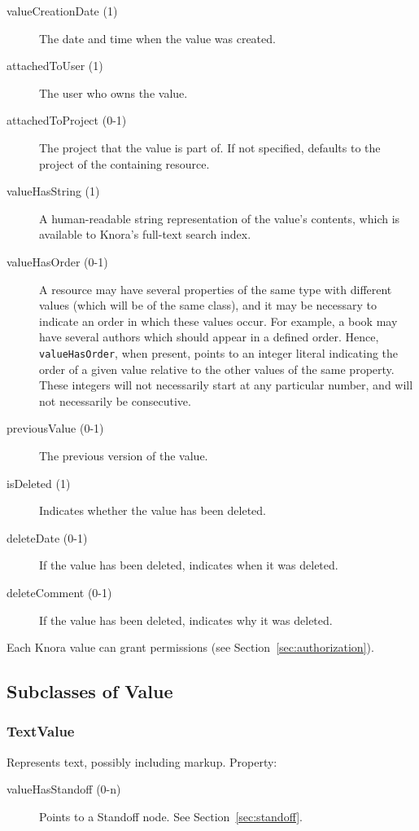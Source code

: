 \documentclass[12pt, a4paper]{article}
\begin{document}
\begin{description}
  \item[valueCreationDate (1)] The date and time when the value was created.
  \item[attachedToUser (1)] The user who owns the value.
  \item[attachedToProject (0-1)] The project that the value is part of. If not specified, defaults to the project of the containing resource.
  \item[valueHasString (1)] A human-readable string representation of the value's contents, which is available to Knora's full-text search index.
  \item[valueHasOrder (0-1)] A resource may have several properties of the same type with different values (which will be of the same class), and it may be necessary to indicate an order in which these values occur. For example, a book may have several authors which should appear in a defined order. Hence, \texttt{valueHasOrder}, when present, points to an integer literal indicating the order of a given value relative to the other values of the same property. These integers will not necessarily start at any particular number, and will not necessarily be consecutive.
  \item[previousValue (0-1)] The previous version of the value.
  \item[isDeleted (1)] Indicates whether the value has been deleted.
  \item[deleteDate (0-1)] If the value has been deleted, indicates when it was deleted.
  \item[deleteComment (0-1)] If the value has been deleted, indicates why it was deleted.
\end{description}

Each Knora value can grant permissions (see Section~\ref{sec:authorization}).

\subsection{Subclasses of Value}

\subsubsection{TextValue}

Represents text, possibly including markup. Property:

\begin{description}
	\item[valueHasStandoff (0-n)] Points to a Standoff node. See Section~\ref{sec:standoff}.
\end{description}
\end{document}
